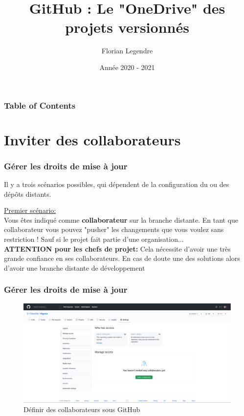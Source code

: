 \documentclass{beamer}
\title[Github]{GitHub : Le "OneDrive" des projets versionnés}
\author{Florian Legendre}
\institute{Université de Poitiers}
\date{Année 2020 - 2021}
\begin{document}
\frame{\titlepage}

\begin{frame}
\frametitle{Table of Contents}
\tableofcontents[hideallsubsections]
\end{frame}




\section{Inviter des collaborateurs}
\begin{frame}
\frametitle{Gérer les droits de mise à jour}
Il y a trois scénarios possibles, qui dépendent de la configuration du ou des dépôts distants.
\medskip

\underline{Premier scénario:}\\
\smallskip
Vous êtes indiqué comme \textbf{collaborateur} sur la branche distante. En tant que collaborateur vous pouvez "pusher" les changements que vous voulez sans restriction ! Sauf si le projet fait partie d'une organisation...\\
\medskip
\textbf{ATTENTION pour les chefs de projet:} Cela nécessite d'avoir une très grande confiance en ses collaborateurs. En cas de doute une des solutions alors d'avoir une branche distante de développement
\end{frame}

\begin{frame}
\frametitle{Gérer les droits de mise à jour}

\begin{center}
\begin{figure}[h!]
    \includegraphics[scale=0.15]{images/droits_push/collaborator.png}
    \caption{Définir des collaborateurs sous GitHub}
\end{figure}
\end{center}

\end{frame}
\end{document}
